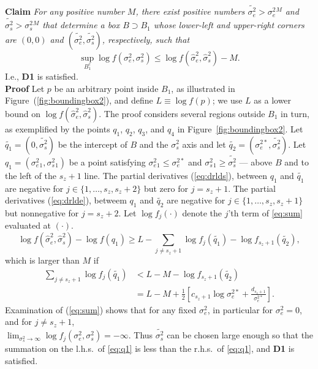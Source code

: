 \documentclass{report}
\newcommand{\RL}{f}
\newcommand{\logRL}{\log\RL}
\newcommand{\sigssq}{\sigma_s^2}
\newcommand{\sigesq}{\sigma_e^2}
\newcommand{\sshat}{\hat\sigma^2_e,\hat\sigma^2_s}
\newcommand{\logRLss}{\logRL(\sigesq,\sigssq)}
\begin{document}
\noindent\textbf{Claim} \emph{For any positive number $M$, there exist positive numbers $\widetilde{\sigma_e^2} > \sigesq{}^M$ and $\widetilde{\sigma_s^2} > \sigssq{}^M$ that determine a box $B \supset B_1$ whose lower-left and upper-right corners are $(0,0)$ and $(\widetilde{\sigma_e^2}, \widetilde{\sigma_s^2})$, respectively, such that
\begin{equation*}
  \sup_{B_1^c} \logRLss \le \logRL(\sshat) - M.
\end{equation*}}
I.e., \textbf{D1} is satisfied.\\
\noindent\textbf{Proof}
Let $p$ be an arbitrary point inside $B_1$, as illustrated in Figure~(\ref{fig:boundingbox2}), and define $L \equiv \logRL(p)$; we use $L$ as a lower bound on $\logRL(\sshat)$.  The proof considers several regions outside $B_1$ in turn, as exemplified by the points $q_1$, $q_2$, $q_3$, and $q_4$ in Figure~\ref{fig:boundingbox2}.  Let $\widetilde{q_1} = (0,\widetilde{\sigma_s^2})$ be the intercept of $B$ and the $\sigssq$ axis and let $\widetilde{q_2} = (\sigma_e^{2*},\widetilde{\sigma_s^2})$.  Let $q_1 = (\sigesq{}_1, \sigssq{}_1)$ be a point satisfying $\sigesq{}_1 \le \sigma_e^{2*}$ and $\sigssq{}_1 \ge \widetilde{\sigma_s^2}$ --- above $B$ and to the left of the $s_z+1$ line.  The partial derivatives (\ref{eq:drlds}), between $q_1$ and $\widetilde{q_1}$ are negative for $j \in \{1, \dots, s_z, s_z+2\}$ but zero for $j=s_z+1$.  The partial derivatives (\ref{eq:drlde}), betweem $q_1$ and $\widetilde{q_2}$ are negative for $j \in \{1, \dots, s_z, s_z+1\}$ but nonnegative for $j=s_z+2$.  Let $\logRL_j(\cdot)$ denote the $j$'th term of \eqref{eq:sum} evaluated at $(\cdot)$.  
\begin{equation}
	\logRL(\sshat) - \logRL(q_1) \ge L - \sum_{j \ne s_z+1} \logRL_j(\widetilde{q_1}) - \logRL_{s_z+1}(\widetilde{q_2}),
\end{equation}
which is larger than $M$ if
\begin{equation}
\label{eq:q1}
  \begin{split}
    \sum_{j \ne s_z+1} \logRL_j(\widetilde{q_1})
      &< L - M - \logRL_{s_z+1}(\widetilde{q_2})\\
      &= L - M + \frac{1}{2} \left[ c_{s_z+1}\log\sigma_e^{2*} + \frac{d_{s_z+1}}{\sigma_e^{2*}}\right].
  \end{split}
\end{equation}
Examination of (\ref{eq:sum}) shows that for any fixed $\sigesq$, in particular for $\sigesq=0$, and for $j \ne s_z+1$,\\ $\lim_{\sigssq \rightarrow \infty} \logRL_j(\sigesq,\sigssq) = -\infty$.  Thus $\widetilde{\sigma_s^2}$ can be chosen large enough so that the summation on the l.h.s.~of \eqref{eq:q1} is less than the r.h.s.~of \eqref{eq:q1}, and  \textbf{D1} is satisfied.
\end{document}
